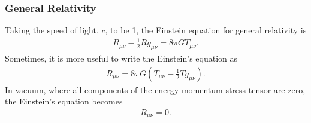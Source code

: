 \documentclass[a4paper,11pt]{article}
\numberwithin{equation}{section}
\theoremstyle{definition}
\begin{document}
\subsubsection{General Relativity}
Taking the speed of light, $c$, to be 1, the Einstein equation for general relativity is
\begin{align}
R_{\mu\nu} - \frac{1}{2}Rg_{\mu\nu} = 8\pi GT_{\mu\nu}.
\end{align}
Sometimes, it is more useful to write the Einstein's equation as
\begin{align}
R_{\mu\nu} = 8\pi G \left( T_{\mu\nu} - \frac{1}{2}Tg_{\mu\nu} \right).
\end{align}
In vacuum, where all components of the energy-momentum stress tensor are zero, the Einstein's equation becomes
\begin{align}
R_{\mu\nu} = 0.
\end{align}
\end{document}
